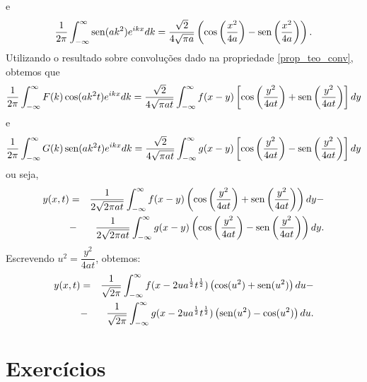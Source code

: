 e
\begin{equation*}
\frac{1}{2\pi}\int_{-\infty}^\infty \operatorname{sen} (ak^2)e^{ik
x}dk=\frac{\sqrt{2}}{4\sqrt{\pi a}}\left(\cos\left( \frac{x^2}{4a}\right)-\operatorname{sen}\left(
\frac{x^2}{4a}\right)\right).
\end{equation*}
Utilizando o resultado sobre convoluções dado na propriedade \ref{prop_teo_conv}, obtemos que
\begin{equation*}
\frac{1}{2\pi}\int_{-\infty}^\infty F(k)\cos (ak^2
t)e^{ik x}dk=\frac{\sqrt{2}}{4\sqrt{\pi a t}}\int_{-\infty}^\infty
f(x-y)\left[\cos \left(\frac{y^2}{4at}\right)+\operatorname{sen}\left( \frac{y^2}{4at}\right)\right]dy
\end{equation*}
e 
\begin{equation*}
\frac{1}{2\pi}\int_{-\infty}^\infty G(k)\operatorname{sen} (ak^2
t)e^{ik x}dk=\frac{\sqrt{2}}{4\sqrt{\pi a t}}\int_{-\infty}^\infty
g(x-y)\left[\cos \left(\frac{y^2}{4at}\right)-\operatorname{sen}\left( \frac{y^2}{4at}\right)\right]dy
\end{equation*}
ou seja,
\begin{eqnarray*}
y(x,t)&=&\frac{1}{2\sqrt{2\pi a t}}\int_{-\infty}^\infty
f(x-y)\left(\cos\left( \frac{y^2}{4at}\right)+\operatorname{sen}\left( \frac{y^2}{4at}\right)\right)dy-\\
&-&\frac{1}{2\sqrt{2\pi a t}}\int_{-\infty}^\infty
g(x-y)\left(\cos \left(\frac{y^2}{4at}\right)-\operatorname{sen}\left( \frac{y^2}{4at}\right)\right)dy.
\end{eqnarray*}
Escrevendo $u^2=\dfrac{y^2}{4at}$, obtemos:
\begin{eqnarray*}
y(x,t)&=&\frac{1}{\sqrt{2\pi}}\int_{-\infty}^\infty
f(x-2u a^{\frac{1}{2}}t^{\frac{1}{2}})\left(\cos (u^2)+\operatorname{sen} (u^2)\right)du-\\
&-&\frac{1}{\sqrt{2\pi}}\int_{-\infty}^\infty g(x-2u
a^{\frac{1}{2}}t^{\frac{1}{2}})\left(\operatorname{sen} (u^2)-\cos (u^2)\right)du.
\end{eqnarray*}

\section{Exercícios}

